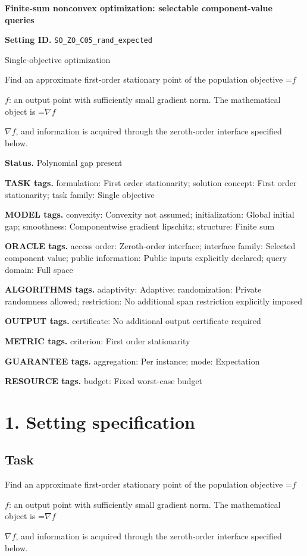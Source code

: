 \documentclass[10pt,a4paper]{article}
\newcommand{\AtlasMath}[1]{\par\begingroup\centering\setbox0=\hbox{$\displaystyle #1$}\ifdim\wd0>1.4\linewidth\typeout{ATLAS WIDE FORMULA: \the\wd0}\fi\ifdim\wd0>\linewidth\resizebox{\linewidth}{!}{\box0}\else\box0\fi\par\endgroup}
\newcommand{\AtlasInlineMath}[1]{\begingroup\setbox0=\hbox{$#1$}\ifdim\wd0>.4\linewidth\endgroup\AtlasMath{#1}\else\endgroup$#1$\fi}
\begin{document}
\raggedright

{\LARGE\bfseries\sffamily\color{AtlasNavy} Finite-sum nonconvex optimization: selectable component-value queries\par}\vspace{5pt}
\textbf{Setting ID.} \texttt{SO\_\allowbreak{}ZO\_\allowbreak{}C05\_\allowbreak{}rand\_\allowbreak{}expected}

Single-objective optimization

Find an approximate first-order stationary point of the population objective \AtlasInlineMath{f}: an output point with sufficiently small gradient norm. The mathematical object is \AtlasInlineMath{\nabla f}, and information is acquired through the zeroth-order interface specified below.

\textbf{Status.} Polynomial gap present

\textbf{TASK tags.} formulation: First order stationarity; solution concept: First order stationarity; task family: Single objective

\textbf{MODEL tags.} convexity: Convexity not assumed; initialization: Global initial gap; smoothness: Componentwise gradient lipschitz; structure: Finite sum

\textbf{ORACLE tags.} access order: Zeroth-order interface; interface family: Selected component value; public information: Public inputs explicitly declared; query domain: Full space

\textbf{ALGORITHMS tags.} adaptivity: Adaptive; randomization: Private randomness allowed; restriction: No additional span restriction explicitly imposed

\textbf{OUTPUT tags.} certificate: No additional output certificate required

\textbf{METRIC tags.} criterion: First order stationarity

\textbf{GUARANTEE tags.} aggregation: Per instance; mode: Expectation

\textbf{RESOURCE tags.} budget: Fixed worst-case budget

\section{1. Setting specification}
\subsection{Task}
Find an approximate first-order stationary point of the population objective \AtlasInlineMath{f}: an output point with sufficiently small gradient norm. The mathematical object is \AtlasInlineMath{\nabla f}, and information is acquired through the zeroth-order interface specified below.
\end{document}
